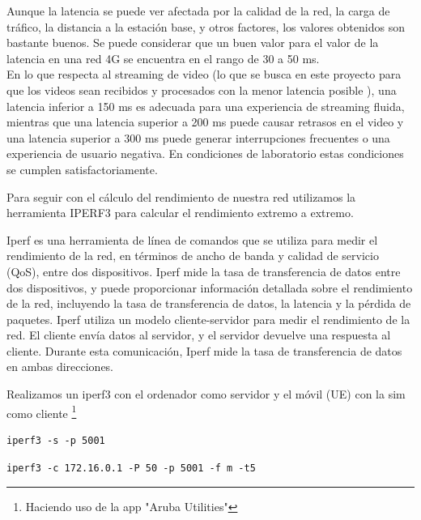 Aunque la latencia se puede ver afectada por la calidad de la red, la carga de tráfico, la distancia a la estación base, y otros factores, los valores obtenidos son bastante buenos. Se puede considerar que un buen valor para el valor de la latencia en una red 4G se encuentra en el rango de 30 a 50 ms.\\
En lo que respecta al streaming de video (lo que se busca en este proyecto para que los videos sean recibidos y procesados con la menor latencia posible ), una latencia inferior a 150 ms es adecuada para una experiencia de streaming fluida, mientras que una latencia superior a 200 ms puede causar retrasos en el video y una latencia superior a 300 ms puede generar interrupciones frecuentes o una experiencia de usuario negativa. En condiciones de laboratorio estas condiciones se cumplen satisfactoriamente. 

Para seguir con el cálculo del rendimiento de nuestra red utilizamos la herramienta IPERF3 para calcular el rendimiento extremo a extremo.  

Iperf es una herramienta de línea de comandos que se utiliza para medir el rendimiento de la red, en términos de ancho de banda y calidad de servicio (QoS), entre dos dispositivos.
Iperf mide la tasa de transferencia de datos entre dos dispositivos, y puede proporcionar información detallada sobre el rendimiento de la red, incluyendo la tasa de transferencia de datos, la latencia y la pérdida de paquetes. Iperf utiliza un modelo cliente-servidor para medir el rendimiento de la red.
El cliente envía datos al servidor, y el servidor devuelve una respuesta al cliente. Durante esta comunicación, Iperf mide la tasa de transferencia de datos en ambas direcciones.

Realizamos un iperf3 con el ordenador como servidor y el móvil (UE) con la sim como cliente \footnote{Haciendo uso de la app "Aruba Utilities"}

\begin{verbatim}
iperf3 -s -p 5001
\end{verbatim}

\begin{verbatim}
iperf3 -c 172.16.0.1 -P 50 -p 5001 -f m -t5
\end{verbatim}



